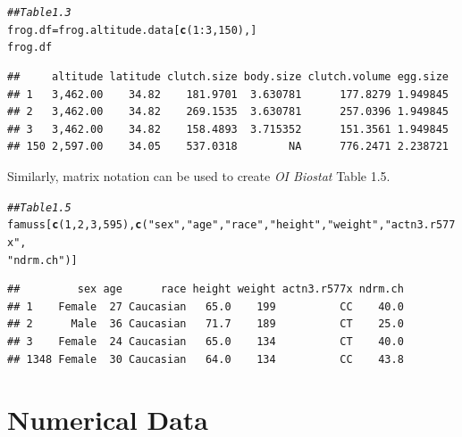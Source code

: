 \documentclass{article}\usepackage[]{graphicx}\usepackage[]{color}
\makeatletter
\newcommand{\hlnum}[1]{\textcolor[rgb]{0.686,0.059,0.569}{#1}}%
\newcommand{\hlstr}[1]{\textcolor[rgb]{0.192,0.494,0.8}{#1}}%
\newcommand{\hlcom}[1]{\textcolor[rgb]{0.678,0.584,0.686}{\textit{#1}}}%
\newcommand{\hlopt}[1]{\textcolor[rgb]{0,0,0}{#1}}%
\newcommand{\hlstd}[1]{\textcolor[rgb]{0.345,0.345,0.345}{#1}}%
\newcommand{\hlkwb}[1]{\textcolor[rgb]{0.69,0.353,0.396}{#1}}%
\newcommand{\hlkwd}[1]{\textcolor[rgb]{0.737,0.353,0.396}{\textbf{#1}}}%
\newenvironment{kframe}{%
 \def\at@end@of@kframe{}%
 \ifinner\ifhmode%
  \def\at@end@of@kframe{\end{minipage}}%
  \begin{minipage}{\columnwidth}%
 \fi\fi%
 \def\FrameCommand##1{\hskip\@totalleftmargin \hskip-\fboxsep
 \colorbox{shadecolor}{##1}\hskip-\fboxsep
     \hskip-\linewidth \hskip-\@totalleftmargin \hskip\columnwidth}%
 \MakeFramed {\advance\hsize-\width
   \@totalleftmargin\z@ \linewidth\hsize
   \@setminipage}}%
 {\par\unskip\endMakeFramed%
 \at@end@of@kframe}
\newenvironment{knitrout}{}{} %
\makeatother
\begin{document}
\begin{knitrout}
\color{fgcolor}\begin{kframe}
\begin{alltt}
\hlcom{## Table 1.3}
\hlstd{frog.df} \hlkwb{=} \hlstd{frog.altitude.data[}\hlkwd{c}\hlstd{(}\hlnum{1}\hlopt{:}\hlnum{3}\hlstd{,} \hlnum{150}\hlstd{),]}
\hlstd{frog.df}
\end{alltt}
\begin{verbatim}
##     altitude latitude clutch.size body.size clutch.volume egg.size
## 1   3,462.00    34.82    181.9701  3.630781      177.8279 1.949845
## 2   3,462.00    34.82    269.1535  3.630781      257.0396 1.949845
## 3   3,462.00    34.82    158.4893  3.715352      151.3561 1.949845
## 150 2,597.00    34.05    537.0318        NA      776.2471 2.238721
\end{verbatim}
\end{kframe}
\end{knitrout}

Similarly, matrix notation can be used to create \textit{OI Biostat} Table 1.5.

\begin{knitrout}
\color{fgcolor}\begin{kframe}
\begin{alltt}
\hlcom{## Table 1.5}
\hlstd{famuss[}\hlkwd{c}\hlstd{(}\hlnum{1}\hlstd{,}\hlnum{2}\hlstd{,}\hlnum{3}\hlstd{,}\hlnum{595}\hlstd{),}\hlkwd{c}\hlstd{(} \hlstr{"sex"}\hlstd{,} \hlstr{"age"}\hlstd{,} \hlstr{"race"}\hlstd{,} \hlstr{"height"}\hlstd{,} \hlstr{"weight"}\hlstd{,} \hlstr{"actn3.r577x"}\hlstd{,}
                       \hlstr{"ndrm.ch"}\hlstd{)]}
\end{alltt}
\begin{verbatim}
##         sex age      race height weight actn3.r577x ndrm.ch
## 1    Female  27 Caucasian   65.0    199          CC    40.0
## 2      Male  36 Caucasian   71.7    189          CT    25.0
## 3    Female  24 Caucasian   65.0    134          CT    40.0
## 1348 Female  30 Caucasian   64.0    134          CC    43.8
\end{verbatim}
\end{kframe}
\end{knitrout}

\section{Numerical Data}
\end{document}
